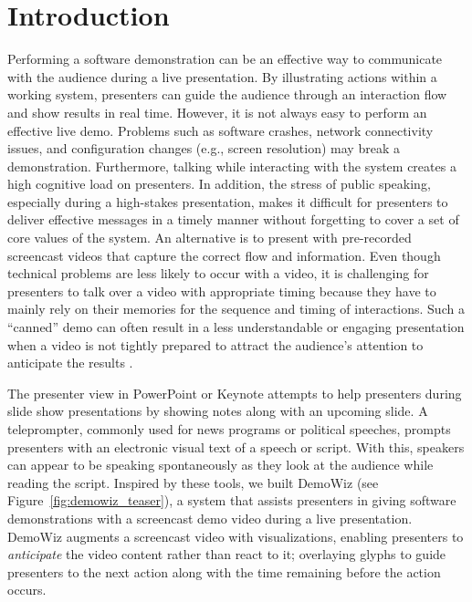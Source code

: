 \section{Introduction}

Performing a software demonstration can be an effective way to communicate with the audience during a live presentation. By illustrating actions within a working system, presenters can guide the audience through an interaction flow and show results in real time. However, it is not always easy to perform an effective live demo. Problems such as software crashes, network connectivity issues, and configuration changes (e.g., screen resolution) may break a demonstration. Furthermore, talking while interacting with the system creates a high cognitive load on presenters. In addition, the stress of public speaking, especially during a high-stakes presentation, makes it difficult for presenters to deliver effective messages in a timely manner without forgetting to cover a set of core values of the system. An alternative is to present with pre-recorded screencast videos that capture the correct flow and information. Even though technical problems are less likely to occur with a video, it is challenging for presenters to talk over a video with appropriate timing because they have to mainly rely on their memories for the sequence and timing of interactions. Such a “canned” demo can often result in a less understandable or engaging presentation when a video is not tightly prepared to attract the audience's attention to anticipate the results \cite{cohan2005great}.

The presenter view in PowerPoint or Keynote attempts to help presenters during slide show presentations by showing notes along with an upcoming slide. A teleprompter, commonly used for news programs or political speeches, prompts presenters with an electronic visual text of a speech or script. With this, speakers can appear to be speaking spontaneously as they look at the audience while reading the script. Inspired by these tools, we built DemoWiz (see Figure~\ref{fig:demowiz_teaser}), a system that assists presenters in giving software demonstrations with a screencast demo video during a live presentation. DemoWiz augments a screencast video with visualizations, enabling presenters to \textit{anticipate} the video content rather than react to it; overlaying glyphs to guide presenters to the next action along with the time remaining before the action occurs.

